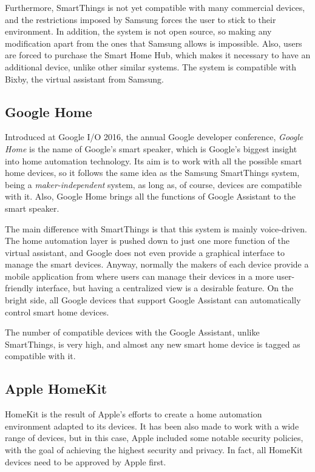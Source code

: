 Furthermore, SmartThings is not yet compatible with many commercial devices, and the restrictions imposed by Samsung forces the
user to stick to their environment. In addition, the system is not open source, so making any modification apart from the ones that
Samsung allows is impossible. Also, users are forced to purchase the Smart Home Hub, which makes it necessary to have an additional
device, unlike other similar systems. The system is compatible with Bixby, the virtual assistant from Samsung.

\subsection{Google Home}
Introduced at Google I/O 2016, the annual Google developer conference, \textit{Google Home} is the name of Google's smart speaker,
which is Google's biggest insight into home automation technology. Its aim is to work with all the possible smart home devices, so it
follows the same idea as the Samsung SmartThings system, being a \textit{maker-independent} system, as long as, of course, devices
are compatible with it. Also, Google Home brings all the functions of Google Assistant to the smart speaker.

The main difference with SmartThings is that this system is mainly voice-driven. The home automation layer is pushed down to just
one more function of the virtual assistant, and Google does not even provide a graphical interface to manage the smart devices.
Anyway, normally the makers of each device provide a mobile application from where users can manage their devices in a more
user-friendly interface, but having a centralized view is a desirable feature. On the bright side, all Google devices that support
Google Assistant can automatically control smart home devices.

The number of compatible devices with the Google Assistant, unlike SmartThings, is very high, and almost any new smart home
device is tagged as compatible with it.

\subsection{Apple HomeKit}
HomeKit is the result of Apple's efforts to create a home automation environment adapted to its devices. It has been also made to work
with a wide range of devices, but in this case, Apple included some notable security policies, with the goal of achieving the highest
security and privacy. In fact, all HomeKit devices need to be approved by Apple first.

